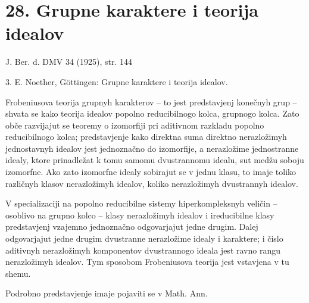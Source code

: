 \documentclass[11pt]{article}
\begin{document}
\section*{28. Grupne karaktere i teorija idealov}

\begin{center}
J. Ber. d. DMV 34 (1925), str. 144
\end{center}

3. E. Noether, Göttingen: Grupne karaktere i teorija idealov.

Frobeniusova teorija grupnyh karakterov -- to jest predstavjenj konečnyh grup -- shvata se kako teorija idealov popolno reducibilnogo kolca, grupnogo kolca. Zato obče razvijajut se teoremy o izomorfiji pri aditivnom razkladu popolno reducibilnogo kolca; predstavjenje kako direktna suma direktno nerazložimyh jednostavnyh idealov jest jednoznačno do izomorfije, a nerazložime jednostranne idealy, ktore prinadležat k tomu samomu dvustrannomu idealu, sut medžu soboju izomorfne. Ako zato izomorfne idealy sobirajut se v jednu klasu, to imaje toliko različnyh klasov nerazložimyh idealov, koliko nerazložimyh dvustrannyh idealov.

V specializaciji na popolno reducibilne sistemy hiperkompleksnyh veličin -- osoblivo na grupno kolco -- klasy nerazložimyh idealov i ireducibilne klasy predstavjenj vzajemno jednoznačno odgovarjajut jedne drugim. Dalej odgovarjajut jedne drugim dvustranne nerazložime idealy i karaktere; i čislo aditivnyh nerazložimyh komponentov dvustrannogo ideala jest ravno rangu nerazložimyh idealov. Tym sposobom Frobeniusova teorija jest vstavjena v tu shemu.

Podrobno predstavjenje imaje pojaviti se v Math. Ann.
\end{document}
